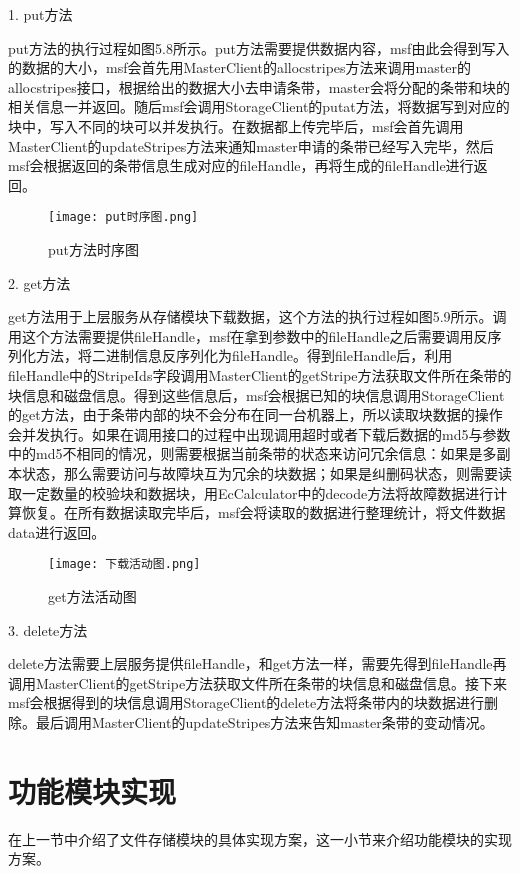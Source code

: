 1. put方法

put方法的执行过程如图5.8所示。put方法需要提供数据内容，msf由此会得到写入的数据的大小，msf会首先用MasterClient的allocstripes方法来调用master的allocstripes接口，根据给出的数据大小去申请条带，master会将分配的条带和块的相关信息一并返回。随后msf会调用StorageClient的putat方法，将数据写到对应的块中，写入不同的块可以并发执行。在数据都上传完毕后，msf会首先调用MasterClient的updateStripes方法来通知master申请的条带已经写入完毕，然后msf会根据返回的条带信息生成对应的fileHandle，再将生成的fileHandle进行返回。

\begin{figure}[h]
  \centering
  \texttt{[image: put时序图.png]}
  \caption{put方法时序图}
\end{figure}

2. get方法

get方法用于上层服务从存储模块下载数据，这个方法的执行过程如图5.9所示。调用这个方法需要提供fileHandle，msf在拿到参数中的fileHandle之后需要调用反序列化方法，将二进制信息反序列化为fileHandle。得到fileHandle后，利用fileHandle中的StripeIds字段调用MasterClient的getStripe方法获取文件所在条带的块信息和磁盘信息。得到这些信息后，msf会根据已知的块信息调用StorageClient的get方法，由于条带内部的块不会分布在同一台机器上，所以读取块数据的操作会并发执行。如果在调用接口的过程中出现调用超时或者下载后数据的md5与参数中的md5不相同的情况，则需要根据当前条带的状态来访问冗余信息：如果是多副本状态，那么需要访问与故障块互为冗余的块数据；如果是纠删码状态，则需要读取一定数量的校验块和数据块，用EcCalculator中的decode方法将故障数据进行计算恢复。在所有数据读取完毕后，msf会将读取的数据进行整理统计，将文件数据data进行返回。

\begin{figure}[h]
  \centering
  \texttt{[image: 下载活动图.png]}
  \caption{get方法活动图}
\end{figure}

3. delete方法

delete方法需要上层服务提供fileHandle，和get方法一样，需要先得到fileHandle再调用MasterClient的getStripe方法获取文件所在条带的块信息和磁盘信息。接下来msf会根据得到的块信息调用StorageClient的delete方法将条带内的块数据进行删除。最后调用MasterClient的updateStripes方法来告知master条带的变动情况。

\section{功能模块实现}%
在上一节中介绍了文件存储模块的具体实现方案，这一小节来介绍功能模块的实现方案。

